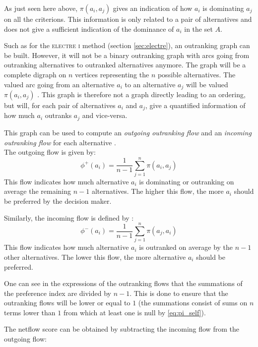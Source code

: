 As just seen here above, $\pi(a_i,a_j)$ gives an indication of how $a_i$ is dominating $a_j$ on all the criterions.
This information is only related to a pair of alternatives and does not give a sufficient indication of the dominance of $a_i$ in the set $A$.

Such as for the \textsc{electre i} method (section \ref{sec:electre}), an outranking graph can be built. However, it will not be a binary outranking graph with arcs going from outranking alternatives to outranked alternatives anymore.
The graph will be a complete digraph on $n$ vertices representing the $n$ possible alternatives. The valued arc going from an alternative $a_i$ to an alternative $a_j$ will be valued $\pi(a_i,a_j)$ \cite{BransVincke85}.
This graph is therefore not a graph directly leading to an ordering, but will, for each pair of alternatives $a_i$ and $a_j$, give a quantified information of how much $a_i$ outranks $a_j$ and vice-versa.

This graph can be used to compute an \textit{outgoing outranking flow} and an \textit{incoming outranking flow} for each alternative \cite{Bertrand2002}. \\
The outgoing flow is given by:
\begin{equation}
    \phi^+(a_i) = \frac{1}{n-1}\sum\limits^n_{j=1} \pi(a_i,a_j)
    \label{eq:outgoing_flow}
\end{equation}
This flow indicates how much alternative $a_i$ is dominating or outranking on average the remaining $n-1$ alternatives. The higher this flow, the more $a_i$ should be preferred by the decision maker.

Similarly, the incoming flow is defined by \cite{Bertrand2002}:
\begin{equation}
    \phi^{-}(a_i) = \frac{1}{n-1}\sum\limits^n_{j=1} \pi(a_j,a_i)
    \label{eq:incoming_flow}
\end{equation}
This flow indicates how much alternative $a_i$ is outranked on average by the $n-1$ other alternatives. The lower this flow, the more alternative $a_i$ should be preferred.

One can see in the expressions of the outranking flows that the summations of the preference index are divided by $n-1$. This is done to ensure that the outranking flows will be lower or equal to $1$ (the summations consist of sums on $n$ terms lower than $1$ from which at least one is null by \eqref{eq:pi_self}).

The netflow score can be obtained by subtracting the incoming flow from the outgoing flow:

